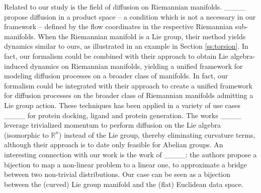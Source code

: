 Related to our study is the field of diffusion on Riemannian manifolds. ____ propose diffusion in a product space -- a condition which is not a necessary in our framework -- defined by the flow coordinates in the respective Riemannian sub-manifolds. When the Riemannian manifold is a Lie group, 
their method yields dynamics similar to ours, as illustrated in an example in Section \ref{ss:torsion}. 
In fact, our formalism could be combined with their approach to obtain Lie algebra-induced dynamics on Riemannian manifolds, yielding a unified framework for modeling diffusion processes on a broader class of manifolds.
In fact, our formalism could be integrated with their approach to create a unified framework for diffusion processes on the broader class of Riemannian manifolds admitting a Lie group action. 
These techniques has been applied in a variety of use cases ____ for protein docking, ligand and protein generation.
The works ____
leverage trivialized momentum to perform diffusion on the Lie algebra (isomorphic to \(\mathbb{R}^n\)) instead of the Lie group, thereby eliminating curvature terms, although their approach is to date only feasible for Abelian groups. 
An interesting connection with our work is the work of ____: the authors propose a bijection to map a non-linear problem to a linear one, to approximate a bridge between two non-trivial distributions. Our case can be seen as a bijection between the (curved) Lie group manifold and the (flat) Euclidean data space.